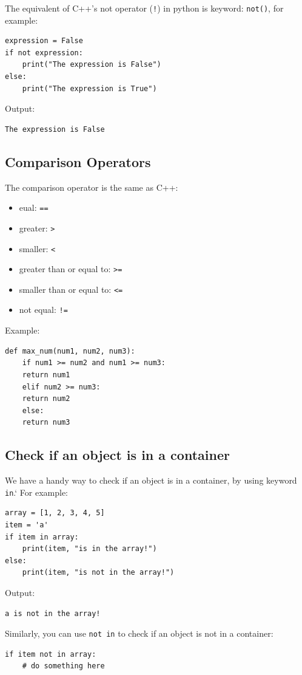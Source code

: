 \documentclass[12pt]{book}
\begin{document}
The equivalent of C++'s not operator (\texttt{!}) in python is keyword: \texttt{not()}, for example:
\begin{verbatim}
expression = False
if not expression:
    print("The expression is False")
else:
    print("The expression is True")
\end{verbatim}
Output:
\begin{verbatim}
The expression is False
\end{verbatim}
\subsection{Comparison Operators}
\label{sec:orgb2eb818}
The comparison operator is the same as C++:
\begin{itemize}
\item eual: \texttt{==}
\item greater: \texttt{>}
\item smaller: \texttt{<}
\item greater than or equal to: \texttt{>=}
\item smaller than or equal to: \texttt{<=}
\item not equal: \texttt{!=}
\end{itemize}

Example:
\begin{verbatim}
def max_num(num1, num2, num3):
    if num1 >= num2 and num1 >= num3:
	return num1
    elif num2 >= num3:
	return num2
    else:
	return num3
\end{verbatim}
\subsection{Check if an object is in a container}
\label{sec:orgb4aeb33}
We have a handy way to check if an object is in a container, by using keyword \texttt{in}.` For example:
\begin{verbatim}
array = [1, 2, 3, 4, 5]
item = 'a'
if item in array:
    print(item, "is in the array!")
else:
    print(item, "is not in the array!")
\end{verbatim}
Output:
\begin{verbatim}
a is not in the array!
\end{verbatim}

Similarly, you can use \texttt{not in} to check if an object is not in a container:
\begin{verbatim}
if item not in array:
    # do something here
\end{verbatim}
\end{document}
